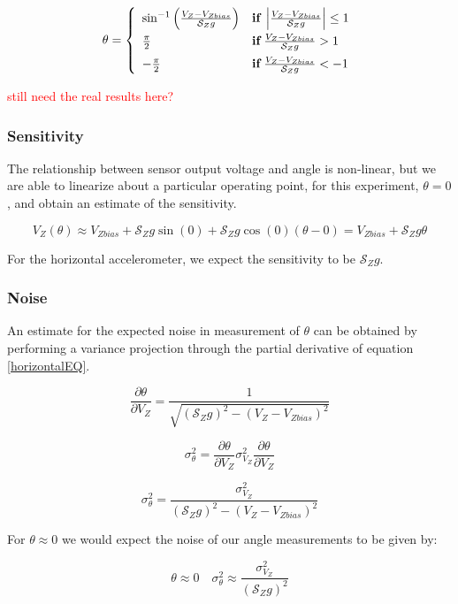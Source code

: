 \documentclass{article}
\newcommand{\xxx}[1]{\textcolor{red}{#1}}
\theoremstyle{plain}
\theoremstyle{definition}
\theoremstyle{remark}
\newcommand{\Sens}{\mathcal{S}}
\begin{document}
$$\theta = \left\{ 
	\begin{array}{l l}
		\sin^{-1} \left(\frac{V_{Z} - V_{Zbias}}{\Sens_{Z} g} \right) & {\bf{if }} \, \left| \frac{V_{Z} - V_{Zbias}}{\Sens_{Z} g} \right| \leq 1 \\[6pt]
		\frac{\pi}{2} & {\bf{if }} \, \frac{V_{Z} - V_{Zbias}}{\Sens_{Z} g} > 1 \\[6pt]
		-\frac{\pi}{2} & {\bf{if} } \, \frac{V_{Z} - V_{Zbias}}{\Sens_{Z} g} < -1
	\end{array} \right. $$

\xxx{still need the real results here?}

\subsubsection{Sensitivity}

The relationship between sensor output voltage and angle is non-linear, but we are able to linearize about a particular operating point, for this experiment, $\theta = 0$, and obtain an estimate of the sensitivity.

$$ V_{Z}(\theta) \approx V_{Zbias} + \Sens_{Z} g \sin(0) + \Sens_{Z} g \cos(0) \left(\theta - 0\right) = V_{Zbias} + \Sens_{Z} g \theta $$

For the horizontal accelerometer, we expect the sensitivity to be $\Sens_{Z} g$. 

\subsubsection{Noise}

An estimate for the expected noise in measurement of $\theta$ can be obtained by performing a variance projection through the partial derivative of equation \ref{horizontalEQ}.

$$ \frac{\partial \theta}{\partial V_{Z}} =  \frac{1}{\sqrt{(\Sens_{Z} g)^2 - (V_{Z} - V_{Zbias})^2}}$$

$$ \sigma^2_{\theta} = \frac{\partial \theta}{\partial V_{Z}} \sigma^2_{V_{Z}} \frac{\partial \theta}{\partial V_{Z}} $$

$$ \sigma^2_{\theta} = \frac{\sigma^2_{V_{Z}}}{(\Sens_{Z} g)^2 - (V_{Z} - V_{Zbias})^2}$$

For $\theta \approx 0$ we would expect the noise of our angle measurements to be given by:

$$ \theta \approx 0 \quad \sigma^2_{\theta} \approx \frac{\sigma^2_{V_{Z}}}{(\Sens_{Z} g)^2}$$
\end{document}
